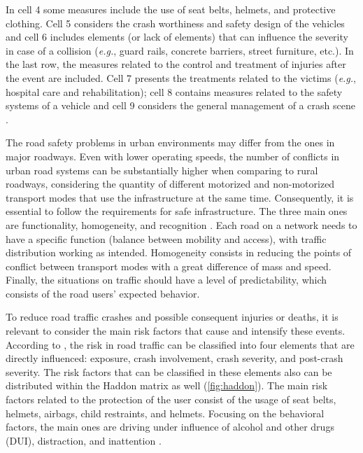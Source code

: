In cell 4 some measures include the use of seat belts, helmets, and protective clothing. Cell 5 considers the crash worthiness and safety design of the vehicles and cell 6 includes elements (or lack of elements) that can influence the severity in case of a collision (\textit{e.g.}, guard rails, concrete barriers, street furniture, etc.). In the last row, the measures related to the control and treatment of injuries after the event are included. Cell 7 presents the treatments related to the victims (\textit{e.g.}, hospital care and rehabilitation); cell 8 contains measures related to the safety systems of a vehicle and cell 9 considers the general management of a crash scene \cite{Mohan2016}. 

The road safety problems in urban environments may differ from the ones in major roadways. Even with lower operating speeds, the number of conflicts in urban road systems can be substantially higher when comparing to rural roadways, considering the quantity of different motorized and non-motorized transport modes that use the infrastructure at the same time. Consequently, it is essential to follow the requirements for safe infrastructure. The three main ones are functionality, homogeneity, and recognition \cite{SWOV2003}. Each road on a network needs to have a specific function (balance between mobility and access), with traffic distribution working as intended. Homogeneity consists in reducing the points of conflict between transport modes with a great difference of mass and speed. Finally, the situations on traffic should have a level of predictability, which consists of the road users' expected behavior. 

To reduce road traffic crashes and possible consequent injuries or deaths, it is relevant to consider the main risk factors that cause and intensify these events. According to \textcite{WHO2004}, the risk in road traffic can be classified into four elements that are directly influenced: exposure, crash involvement, crash severity, and post-crash severity. The risk factors that can be classified in these elements also can be distributed within the Haddon matrix as well (\autoref{fig:haddon}). The main risk factors related to the protection of the user consist of the usage of seat belts, helmets, airbags, child restraints, and helmets. Focusing on the behavioral factors, the main ones are driving under influence of alcohol and other drugs (DUI), distraction, and inattention \cite{Shinar2017}.

